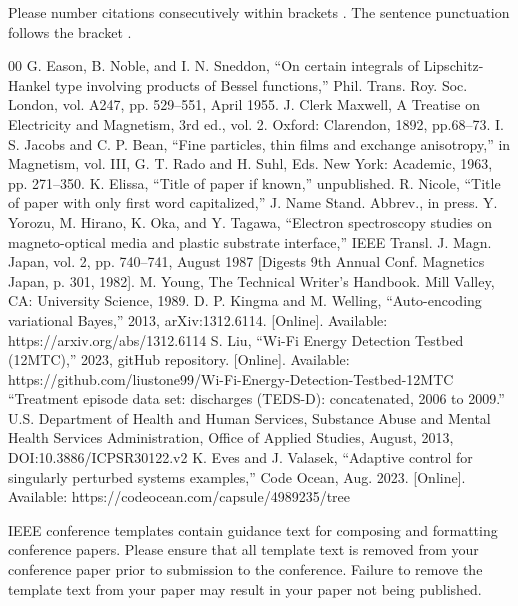 \documentclass[conference]{IEEEtran}
\begin{document}
Please number citations consecutively within brackets \cite{b1}. The 
sentence punctuation follows the bracket \cite{b2}. 

\begin{thebibliography}{00}
 G. Eason, B. Noble, and I. N. Sneddon, ``On certain integrals of Lipschitz-Hankel type involving products of Bessel functions,'' Phil. Trans. Roy. Soc. London, vol. A247, pp. 529--551, April 1955.
 J. Clerk Maxwell, A Treatise on Electricity and Magnetism, 3rd ed., vol. 2. Oxford: Clarendon, 1892, pp.68--73.
 I. S. Jacobs and C. P. Bean, ``Fine particles, thin films and exchange anisotropy,'' in Magnetism, vol. III, G. T. Rado and H. Suhl, Eds. New York: Academic, 1963, pp. 271--350.
 K. Elissa, ``Title of paper if known,'' unpublished.
 R. Nicole, ``Title of paper with only first word capitalized,'' J. Name Stand. Abbrev., in press.
 Y. Yorozu, M. Hirano, K. Oka, and Y. Tagawa, ``Electron spectroscopy studies on magneto-optical media and plastic substrate interface,'' IEEE Transl. J. Magn. Japan, vol. 2, pp. 740--741, August 1987 [Digests 9th Annual Conf. Magnetics Japan, p. 301, 1982].
 M. Young, The Technical Writer's Handbook. Mill Valley, CA: University Science, 1989.
 D. P. Kingma and M. Welling, ``Auto-encoding variational Bayes,'' 2013, arXiv:1312.6114. [Online]. Available: https://arxiv.org/abs/1312.6114
 S. Liu, ``Wi-Fi Energy Detection Testbed (12MTC),'' 2023, gitHub repository. [Online]. Available: https://github.com/liustone99/Wi-Fi-Energy-Detection-Testbed-12MTC
 ``Treatment episode data set: discharges (TEDS-D): concatenated, 2006 to 2009.'' U.S. Department of Health and Human Services, Substance Abuse and Mental Health Services Administration, Office of Applied Studies, August, 2013, DOI:10.3886/ICPSR30122.v2
 K. Eves and J. Valasek, ``Adaptive control for singularly perturbed systems examples,'' Code Ocean, Aug. 2023. [Online]. Available: https://codeocean.com/capsule/4989235/tree
\end{thebibliography}

\vspace{12pt}
\color{red}
IEEE conference templates contain guidance text for composing and formatting conference papers. Please ensure that all template text is removed from your conference paper prior to submission to the conference. Failure to remove the template text from your paper may result in your paper not being published.
\end{document}
